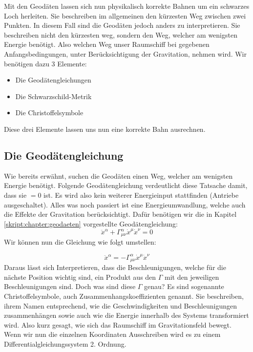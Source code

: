\begin{refsection}
	Mit den Geodäten lassen sich nun physikalisch korrekte Bahnen um ein schwarzes Loch herleiten. Sie beschreiben im allgemeinen den kürzesten Weg zwischen zwei Punkten. In diesem Fall sind die Geodäten jedoch anders zu interpretieren. Sie beschreiben nicht den kürzesten weg, sondern den Weg, welcher am wenigsten Energie benötigt. Also welchen Weg unser Raumschiff bei gegebenen Anfangsbedingungen, unter Berücksichtigung der Gravitation, nehmen wird.  
	Wir benötigen dazu 3 Elemente:
	\begin{itemize}
		\item Die Geodätengleichungen
		\item Die Schwarzschild-Metrik
		\item Die Christoffelsymbole
	\end{itemize}
	Diese drei Elemente lassen uns nun eine korrekte Bahn ausrechnen.

	\subsection{Die Geodätengleichung}
	
	Wie bereits erwähnt, suchen die Geodäten einen Weg, welcher am wenigsten Energie benötigt.
	Folgende Geodätengleichung verdeutlicht diese Tatsache damit, dass sie $=0$ ist. Es wird also kein weiterer Energieinput stattfinden (Antriebe ausgeschaltet). Alles was noch passiert ist eine Energieumwandlung, welche auch die Effekte der Gravitation berücksichtigt. 
	Dafür benötigen wir die in Kapitel \ref{skript:chapter:geodaeten}
	vorgestellte Geodätengleichung:	
	\begin{equation}
	\ddot{x}^{\alpha} + \Gamma^{\alpha}_{\mu\nu}\dot{x}^{\mu}\dot{x}^{\nu} = 0
	\end{equation}
	Wir k\"onnen nun die Gleichung wie folgt umstellen:	
	
	\begin{equation}
	\ddot{x}^{\alpha} = -\Gamma^{\alpha}_{\mu\nu}\dot{x}^{\mu}\dot{x}^{\nu}
	\end{equation}
	Daraus lässt sich Interpretieren, dass die Beschleunigungen, welche für die nächste Position wichtig sind, ein Produkt aus den $\Gamma$ mit den jeweiligen Beschleunigungen sind.
	Doch was sind diese $\Gamma$ genau? Es sind sogenannte Christoffelsymbole, auch Zusammenhangskoeffizienten genannt. Sie beschreiben, ihrem Namen entsprechend, wie die Geschwindigkeiten und Beschleunigungen zusammenhängen sowie auch wie die Energie innerhalb des Systems transformiert wird. Also kurz gesagt, wie sich das Raumschiff im Gravitationsfeld bewegt. Wenn wir nun die einzelnen Koordinaten Ausschreiben wird es zu einem Differentialgleichungssystem 2. Ordnung.
	

\end{refsection}
